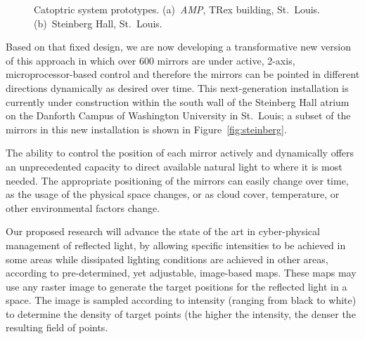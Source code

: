 \begin{figure}[ht]
\centering
{}
\qquad \qquad
{}
\caption{Catoptric system prototypes.
(a)~\emph{AMP}, TRex building, St.~Louis.
(b)~Steinberg Hall, St.~Louis.
}
\label{fig:proto}
\end{figure}

Based on that fixed design, we are now developing a transformative 
new version of this approach in which over 600 mirrors are under 
active, 2-axis, microprocessor-based control and therefore the mirrors
can be pointed in different directions dynamically as desired over time. 
This next-generation installation is currently under construction within 
the south wall of the Steinberg Hall atrium on the Danforth Campus of 
Washington University in St.~Louis; a subset of the mirrors in this new
installation is shown in Figure~\ref{fig:steinberg}.

The ability to control the position of each mirror actively and dynamically
offers an unprecedented capacity to direct available natural light to where
it is most needed.  The appropriate positioning of the mirrors can easily 
change over time, as the usage of the physical space changes, or as cloud
cover, temperature, or other environmental factors change.

Our proposed research will advance the state of the art in cyber-physical
management of reflected light, by allowing specific intensities to be achieved
in some areas while dissipated lighting conditions are achieved in other areas, 
according to pre-determined, yet adjustable, image-based maps. These maps may 
use any raster image to generate the target positions for the reflected light 
in a space.  
The image is sampled according to intensity (ranging from 
black to white) to determine the density of target points (the higher the 
intensity, the denser the resulting field of points. 


